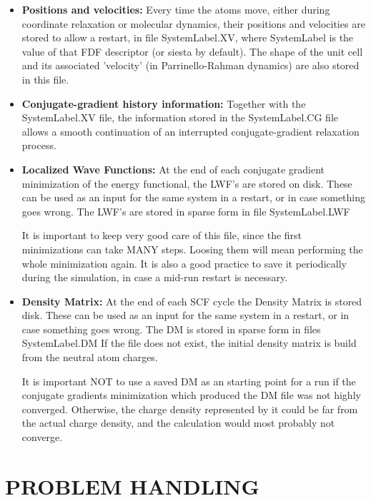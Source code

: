 \documentclass[11pt]{article}
\begin{document}
\begin{itemize}
\item {\bf Positions and velocities:}
Every time the atoms move, either during coordinate relaxation or
molecular dynamics, their positions and velocities are stored
to allow a restart, in file SystemLabel.XV, where SystemLabel
is the value of that FDF descriptor (or siesta by default).
The shape of the
unit cell and its associated 'velocity' (in Parrinello-Rahman
dynamics) are also stored in this file.

\item {\bf Conjugate-gradient history information:}
Together with the SystemLabel.XV file, the information
stored in the SystemLabel.CG file allows a smooth
continuation of an interrupted conjugate-gradient relaxation
process.

\item {\bf Localized Wave Functions:} 
At the end of each conjugate gradient
minimization of the energy functional, the LWF's are
stored on disk. These can be used as an input for
the same system in a restart, or in case something goes
wrong.  The LWF's are stored in sparse form in
file SystemLabel.LWF

It is important to keep very good care of this file,
since the first minimizations can take MANY
steps. Loosing them will mean performing the 
whole minimization again. It is also a good practice 
to save it periodically during the
simulation, in case a mid-run restart is necessary.

\item {\bf Density Matrix:} At the end of each SCF cycle
the Density Matrix is stored
disk. These can be used as an input for
the same system in a restart, or in case something goes
wrong.  The DM is stored in sparse form in files
SystemLabel.DM
If the file does not exist, the initial density
matrix is build from the neutral atom charges.

It is important NOT to use a saved DM as an starting
point for a run if the conjugate gradients minimization
which produced the DM file was not highly converged.
Otherwise, the charge density represented by it
could be far from the actual charge density, and
the calculation would most probably not converge.
\end{itemize}


\section{PROBLEM HANDLING}
\end{document}
